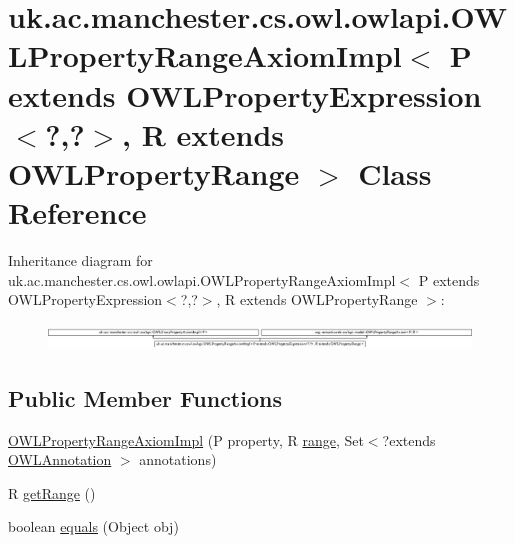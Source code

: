 \hypertarget{classuk_1_1ac_1_1manchester_1_1cs_1_1owl_1_1owlapi_1_1_o_w_l_property_range_axiom_impl_3_01_p_0140de1eb4f83293eb8b942ec8e6d67c5c}{\section{uk.\-ac.\-manchester.\-cs.\-owl.\-owlapi.\-O\-W\-L\-Property\-Range\-Axiom\-Impl$<$ P extends O\-W\-L\-Property\-Expression$<$?,?$>$, R extends O\-W\-L\-Property\-Range $>$ Class Reference}
\label{classuk_1_1ac_1_1manchester_1_1cs_1_1owl_1_1owlapi_1_1_o_w_l_property_range_axiom_impl_3_01_p_0140de1eb4f83293eb8b942ec8e6d67c5c}
}
Inheritance diagram for uk.\-ac.\-manchester.\-cs.\-owl.\-owlapi.\-O\-W\-L\-Property\-Range\-Axiom\-Impl$<$ P extends O\-W\-L\-Property\-Expression$<$?,?$>$, R extends O\-W\-L\-Property\-Range $>$\-:\begin{figure}[H]
\begin{center}
\leavevmode
\includegraphics[height=0.689655cm]{classuk_1_1ac_1_1manchester_1_1cs_1_1owl_1_1owlapi_1_1_o_w_l_property_range_axiom_impl_3_01_p_0140de1eb4f83293eb8b942ec8e6d67c5c}
\end{center}
\end{figure}
\subsection*{Public Member Functions}
\begin{DoxyCompactItemize}
\item 
\hyperlink{classuk_1_1ac_1_1manchester_1_1cs_1_1owl_1_1owlapi_1_1_o_w_l_property_range_axiom_impl_3_01_p_0140de1eb4f83293eb8b942ec8e6d67c5c_a3cbe4219b0aed1ca37a5cee702d9d00c}{O\-W\-L\-Property\-Range\-Axiom\-Impl} (P property, R \hyperlink{classuk_1_1ac_1_1manchester_1_1cs_1_1owl_1_1owlapi_1_1_o_w_l_property_range_axiom_impl_3_01_p_0140de1eb4f83293eb8b942ec8e6d67c5c_a67dee8ca024cbf353808a6ae52b7d7f8}{range}, Set$<$?extends \hyperlink{interfaceorg_1_1semanticweb_1_1owlapi_1_1model_1_1_o_w_l_annotation}{O\-W\-L\-Annotation} $>$ annotations)
\item 
R \hyperlink{classuk_1_1ac_1_1manchester_1_1cs_1_1owl_1_1owlapi_1_1_o_w_l_property_range_axiom_impl_3_01_p_0140de1eb4f83293eb8b942ec8e6d67c5c_a734b193e2c7be5d9c12d23de04ed866e}{get\-Range} ()
\item 
boolean \hyperlink{classuk_1_1ac_1_1manchester_1_1cs_1_1owl_1_1owlapi_1_1_o_w_l_property_range_axiom_impl_3_01_p_0140de1eb4f83293eb8b942ec8e6d67c5c_af5307c2b6c58436ec1ccdc87eaa538b8}{equals} (Object obj)
\end{DoxyCompactItemize}
